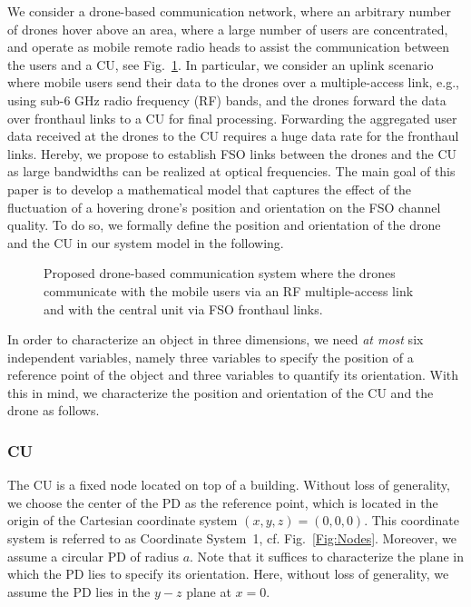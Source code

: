 \documentclass[conference]{IEEEtran}
\begin{document}
We consider a drone-based communication network, where an arbitrary number of drones hover above an area, where a large number of users are concentrated, and operate as mobile remote radio heads to assist the communication between the users and a CU, see Fig.~\ref{Fig:SysMod}. In particular, we consider an uplink scenario where mobile users send their data to the drones over a multiple-access link, e.g., using sub-6 GHz radio frequency (RF) bands, and the drones forward the data over  fronthaul links to a CU for final processing. Forwarding the aggregated user data received at the drones to the CU requires a huge data rate for the fronthaul links. Hereby, we propose to establish FSO links between the drones and the CU as large bandwidths can be realized at optical frequencies.  The main goal of this paper is to develop a mathematical model that captures the effect of the fluctuation of a hovering drone's position and orientation on the FSO channel quality. To do so,  we formally define the position and orientation of the drone and the CU in our system model in the following. 

\begin{figure}[t]
\centering
{}
\caption{Proposed drone-based communication system where the drones communicate with the mobile users via an RF multiple-access link and with the central unit via FSO fronthaul links.}
\label{Fig:SysMod}\vspace{-0.3cm}
\end{figure}


In order to characterize an object in three dimensions, we need \textit{at most} six independent variables, namely three variables to specify the position of a reference point of the object and three variables to quantify its orientation.  With this in mind, we characterize the position and orientation of the CU and the drone as follows.

\subsubsection{CU} The CU is a fixed node located on top of a building. Without loss of generality, we choose the center of the PD as the reference point, which is located in the origin of the Cartesian coordinate system $(x,y,z)=(0,0,0)$. This coordinate system is referred to as Coordinate System~1,  cf. Fig.~\ref{Fig:Nodes}. Moreover, we assume a circular PD of radius $a$. Note that it suffices to characterize the plane in which the PD lies to specify its orientation. Here, without loss of generality, we assume the PD lies in the $y-z$ plane at $x=0$.
\end{document}
